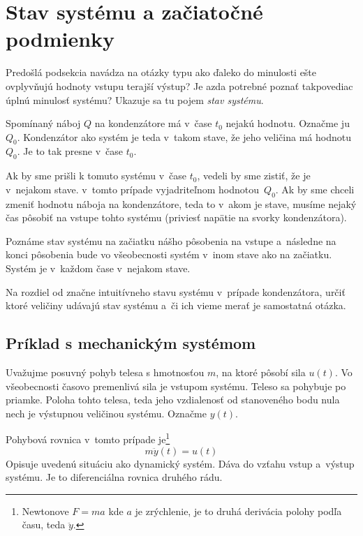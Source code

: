 \documentclass[a4paper, 10pt, ]{article}
\begin{document}
\section{Stav systému a začiatočné podmienky}


Predošlá podsekcia navádza na otázky typu ako ďaleko do minulosti ešte ovplyvňujú hodnoty vstupu terajší výstup? Je azda potrebné poznať takpovediac úplnú minulosť systému? Ukazuje sa tu pojem \emph{stav systému}.

Spomínaný náboj $Q$ na kondenzátore má v~čase $t_0$ nejakú hodnotu. Označme ju~$Q_0$. Kondenzátor ako systém je teda v~takom stave, že jeho veličina má hodnotu~$Q_0$. Je to tak presne v~čase $t_0$. 

Ak by sme prišli k tomuto systému v~čase $t_0$, vedeli by sme zistiť, že je v~nejakom stave. v~tomto prípade vyjadriteľnom hodnotou~$Q_0$. Ak by sme chceli zmeniť hodnotu náboja na kondenzátore, teda to v~akom je stave, musíme nejaký čas pôsobiť na vstupe tohto systému (priviesť napätie na svorky kondenzátora).

Poznáme stav systému na začiatku nášho pôsobenia na vstupe a~následne na konci pôsobenia bude vo všeobecnosti systém v~inom stave ako na začiatku. Systém je v~každom čase v~nejakom stave.

Na rozdiel od značne intuitívneho stavu systému v~prípade kondenzátora, určiť ktoré veličiny udávajú stav systému a~či ich vieme merať je samostatná otázka.



\subsection{Príklad s mechanickým systémom}


Uvažujme posuvný pohyb telesa s hmotnosťou $m$, na ktoré pôsobí sila $u(t)$. Vo všeobecnosti časovo premenlivá sila je vstupom systému. Teleso sa pohybuje po priamke. Poloha tohto telesa, teda jeho vzdialenosť od stanoveného bodu nula nech je výstupnou veličinou systému. Označme $y(t)$.

\begin{center}

    \vbox{%
        \makebox[\textwidth][c]{%
        
        }
    }
	\label{mechTeleso}

\end{center}

Pohybová rovnica v~tomto prípade je\footnote{Newtonove $F = ma$ kde $a$ je zrýchlenie, je to druhá derivácia polohy podľa času, teda $\ddot y$.}
\begin{equation} \label{pohybr}
    m \ddot y(t) = u(t)
\end{equation}
Opisuje uvedenú situáciu ako dynamický systém. Dáva do vzťahu vstup a~výstup systému. Je to diferenciálna rovnica druhého rádu.
\end{document}
